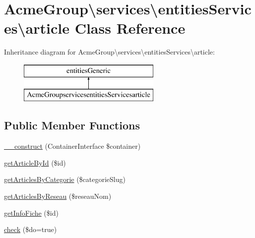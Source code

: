 \hypertarget{class_acme_group_1_1services_1_1entities_services_1_1article}{\section{Acme\+Group\textbackslash{}services\textbackslash{}entities\+Services\textbackslash{}article Class Reference}
\label{class_acme_group_1_1services_1_1entities_services_1_1article}
}
Inheritance diagram for Acme\+Group\textbackslash{}services\textbackslash{}entities\+Services\textbackslash{}article\+:\begin{figure}[H]
\begin{center}
\leavevmode
\includegraphics[height=2.000000cm]{class_acme_group_1_1services_1_1entities_services_1_1article}
\end{center}
\end{figure}
\subsection*{Public Member Functions}
\begin{DoxyCompactItemize}
\item 
\hyperlink{class_acme_group_1_1services_1_1entities_services_1_1article_a245fa6375bce59160d872243571fde8f}{\+\_\+\+\_\+construct} (Container\+Interface \$container)
\item 
\hyperlink{class_acme_group_1_1services_1_1entities_services_1_1article_a4ad70039c81625bd8545fb100ae30336}{get\+Article\+By\+Id} (\$id)
\item 
\hyperlink{class_acme_group_1_1services_1_1entities_services_1_1article_af633b0107d762971469ad73a4b1288c3}{get\+Articles\+By\+Categorie} (\$categorie\+Slug)
\item 
\hyperlink{class_acme_group_1_1services_1_1entities_services_1_1article_a650c93532d4307ad7f568b471114c1da}{get\+Articles\+By\+Reseau} (\$reseau\+Nom)
\item 
\hyperlink{class_acme_group_1_1services_1_1entities_services_1_1article_a52d3d847e1cf2f8565853d4e8a70da5e}{get\+Info\+Fiche} (\$id)
\item 
\hyperlink{class_acme_group_1_1services_1_1entities_services_1_1article_a9abfb40f1c814e6380f2f1f0912b7717}{check} (\$do=true)
\end{DoxyCompactItemize}
